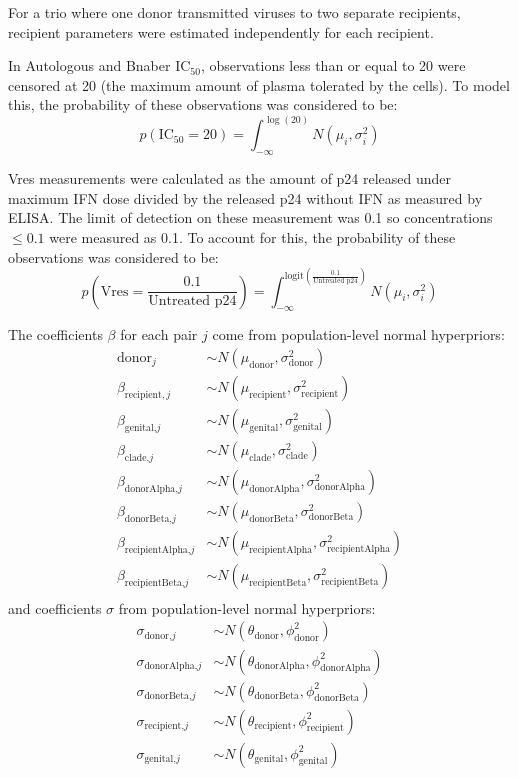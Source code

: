 \documentclass[12pt]{article}
\newcommand{\icFifty}{IC$_{50}$}
\begin{document}
For a trio where one donor transmitted viruses to two separate recipients, recipient parameters were estimated independently for each recipient.

In Autologous and Bnaber \icFifty{}, observations less than or equal to 20 were censored at 20 (the maximum amount of plasma tolerated by the cells).
  To model this, the probability of these observations was considered to be:
\[p(\text{\icFifty}=20)=\int_{-\infty}^{\log(20)}N(\mu_i,\sigma^2_i)\]

Vres measurements were calculated as the amount of p24 released under maximum IFN dose divided by the released p24 without IFN as measured by ELISA. The limit of detection on these measurement was 0.1 so concentrations $\leq 0.1$ were measured as 0.1.
  To account for this, the probability of these observations was considered to be:
\[p\left(\text{Vres}=\frac{0.1}{\text{Untreated p24}}\right)=\int_{-\infty}^{\text{logit}\left(\frac{0.1}{\text{Untreated p24}}\right)}N(\mu_i,\sigma^2_i)\]

The coefficients $\beta$ for each pair $j$ come from population-level normal hyperpriors:
\begin{align*}
\text{donor}_{j} & \sim  N(\mu_{\text{donor}},\sigma^2_{\text{donor}})\\
\beta_{\text{recipient},j} & \sim  N(\mu_{\text{recipient}},\sigma^2_{\text{recipient}})\\
\beta_{\text{genital,}j} & \sim  N(\mu_{\text{genital}},\sigma^2_{\text{genital}})\\
\beta_{\text{clade,}j} & \sim  N(\mu_{\text{clade}},\sigma^2_{\text{clade}}) \\
\beta_{\text{donorAlpha,}j} & \sim  N(\mu_{\text{donorAlpha}},\sigma^2_{\text{donorAlpha}}) \\
\beta_{\text{donorBeta,}j} & \sim  N(\mu_{\text{donorBeta}},\sigma^2_{\text{donorBeta}}) \\
\beta_{\text{recipientAlpha,}j} & \sim  N(\mu_{\text{recipientAlpha}},\sigma^2_{\text{recipientAlpha}}) \\
\beta_{\text{recipientBeta,}j} & \sim  N(\mu_{\text{recipientBeta}},\sigma^2_{\text{recipientBeta}}) \\
\end{align*}
and coefficients $\sigma$ from population-level normal hyperpriors:
\begin{align*}
\sigma_{\text{donor,}j} & \sim  N(\theta_\text{donor},\phi^2_\text{donor})\\
\sigma_{\text{donorAlpha,}j} & \sim  N(\theta_\text{donorAlpha},\phi^2_\text{donorAlpha})\\
\sigma_{\text{donorBeta,}j} & \sim  N(\theta_\text{donorBeta},\phi^2_\text{donorBeta})\\
\sigma_{\text{recipient,}j} & \sim  N(\theta_\text{recipient},\phi^2_\text{recipient})\\
\sigma_{\text{genital,}j} & \sim  N(\theta_\text{genital},\phi^2_\text{genital})\\
\end{align*}
\end{document}
